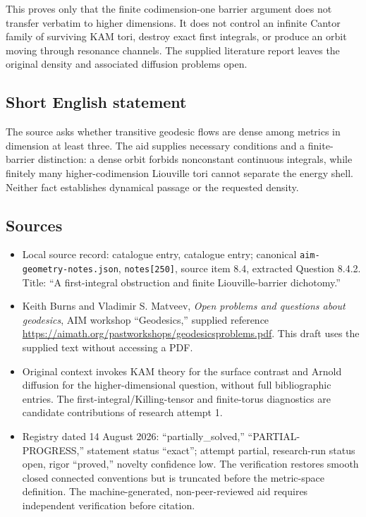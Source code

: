 \documentclass[11pt]{article}
\begin{document}
This proves only that the finite codimension-one barrier argument does not transfer verbatim to higher dimensions. It does not control an infinite Cantor family of surviving KAM tori, destroy exact first integrals, or produce an orbit moving through resonance channels. The supplied literature report leaves the original density and associated diffusion problems open.
\subsection{Short English statement}
The source asks whether transitive geodesic flows are dense among metrics in dimension at least three. The aid supplies necessary conditions and a finite-barrier distinction: a dense orbit forbids nonconstant continuous integrals, while finitely many higher-codimension Liouville tori cannot separate the energy shell. Neither fact establishes dynamical passage or the requested density.
\subsection{Sources}
\begin{itemize}
\item Local source record: catalogue entry, catalogue entry; canonical \texttt{aim-geometry-notes.json}, \texttt{notes[250]}, source item 8.4, extracted Question 8.4.2. Title: ``A first-integral obstruction and finite Liouville-barrier dichotomy.''
\item Keith Burns and Vladimir S. Matveev, \emph{Open problems and questions about geodesics}, AIM workshop ``Geodesics,'' supplied reference \url{https://aimath.org/pastworkshops/geodesicsproblems.pdf}. This draft uses the supplied text without accessing a PDF.
\item Original context invokes KAM theory for the surface contrast and Arnold diffusion for the higher-dimensional question, without full bibliographic entries. The first-integral/Killing-tensor and finite-torus diagnostics are candidate contributions of research attempt 1.
\item Registry dated 14 August 2026: ``partially\_solved,'' ``PARTIAL-PROGRESS,'' statement status ``exact''; attempt partial, research-run status open, rigor ``proved,'' novelty confidence low. The verification restores smooth closed connected conventions but is truncated before the metric-space definition. The machine-generated, non-peer-reviewed aid requires independent verification before citation.
\end{itemize}
\end{document}
